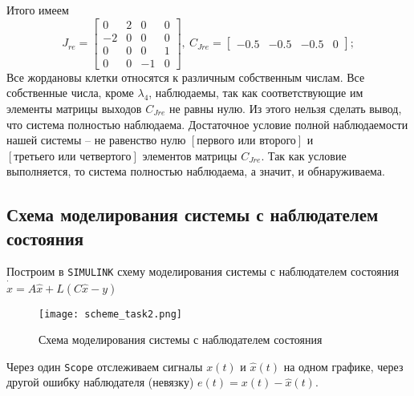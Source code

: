 \documentclass[a4paper, 12pt]{article}
\begin{document}
    Итого имеем
    $$
    J_{re}=\begin{bmatrix}
        0    &2   &0    &0\\
       -2   &0    &0   &0\\
        0   &0    &0    &1\\
       0   &0   &-1   &0
    \end{bmatrix},\ C_{Jre}=\begin{bmatrix}
        -0.5   &-0.5   &-0.5         &0
    \end{bmatrix};
    $$
    Все жордановы клетки относятся к различным собственным числам. Все собственные числа, кроме
    $\lambda_4$, наблюдаемы, так как соответствующие им элементы матрицы выходов $C_{Jre}$
    не равны нулю. Из этого нельзя сделать вывод, что система полностью наблюдаема. Достаточное
    условие полной наблюдаемости нашей системы -- не равенство нулю $\left[\text{первого или второго}\right]$
    и $\left[\text{третьего или четвертого}\right]$ элементов матрицы $C_{Jre}$. Так как условие
    выполняется, то система полностью наблюдаема, а значит, и обнаруживаема.


    \subsection{Схема моделирования системы с наблюдателем состояния}
    Построим в \texttt{SIMULINK} схему моделирования системы с наблюдателем состояния
    $\dot{\hat{x}}=A\hat{x}+L\left(C\hat{x}-y\right)$
    \begin{figure}[H]
        \centering
        \texttt{[image: scheme\_task2.png]}
        \captionsetup{skip=0pt}
        \caption{Схема моделирования системы с наблюдателем состояния}
        \label{fig:scheme_task2}
    \end{figure}
    \noindent Через один \texttt{Scope} отслеживаем сигналы $x(t)\text{ и }\hat{x}(t)$ на одном графике,
    через другой ошибку наблюдателя (невязку) $e(t)=x(t)-\hat{x}(t)$.
\end{document}
